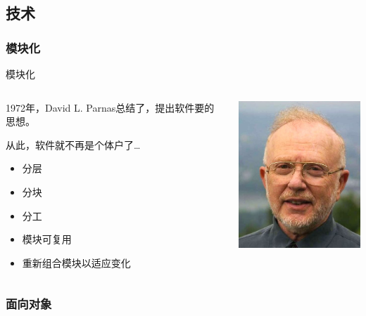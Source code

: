 \subsection{技术}

\subsubsection{模块化}

\begin{frame}{模块化}
  \begin{columns}
    \begin{column}{.5\textwidth}
      \begin{block}{}
        1972年，David L. Parnas总结了，提出软件要的思想。
      \end{block}
      \pause
      \begin{block}{从此，软件就不再是个体户了\dots}
        \begin{itemize}
          \item 分层
          \item 分块
          \item 分工
          \item 模块可复用
          \item 重新组合模块以适应变化
        \end{itemize}
      \end{block}
    \end{column}
    \begin{column}{.5\textwidth}
      \includegraphics[width=5cm]{parnas.jpg}
    \end{column}
  \end{columns}
\end{frame}

\subsubsection{面向对象}

